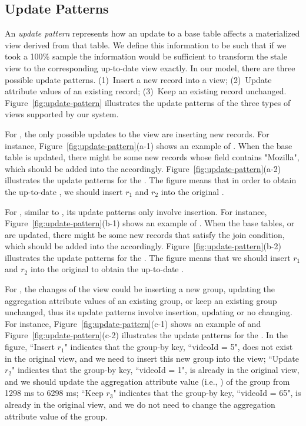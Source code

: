 \subsection{Update Patterns}\label{subsec:pattern}
An \emph{update pattern} represents how an update to a base table affects a materialized view derived from that table.
We define this information to be such that if we took a 100\% sample the information would be sufficient to transform the stale view to the corresponding up-to-date view exactly. 
In our model, there are three possible update patterns. (1)~Insert a new record into a view;
(2)~Update attribute values of an existing record; (3)~Keep an existing record unchanged.
Figure~\ref{fig:update-pattern} illustrates the update patterns of the three types of views supported by our system.

For \spview, the only possible updates to the view are inserting new records.  
For instance, Figure~\ref{fig:update-pattern}(a-1) shows an example of \spview. When the base table  is updated, there might be some new records whose  field contains "Mozilla", which should be added into the \spview accordingly. Figure~\ref{fig:update-pattern}(a-2) illustrates the update patterns for the \spview. The figure means that in order to obtain the up-to-date \spview, we should insert $r_1$ and $r_2$ into the original \spview.

For \fjview, similar to \spview, its update patterns only involve insertion. For instance, Figure~\ref{fig:update-pattern}(b-1) shows an example of \fjview. When the base tables,  or  are updated, there might be some new records that satisfy the join condition, which should be added into the \fjview accordingly. Figure~\ref{fig:update-pattern}(b-2) illustrates the update patterns for the \fjview. The figure means that we should insert $r_1$ and $r_2$ into the original \fjview to obtain the up-to-date \fjview.

For \aggview, the changes of the view could be inserting a new group, updating the aggregation attribute values of an existing group, or keep an existing group unchanged, thus its update patterns involve insertion, updating or no changing. 
For instance, Figure~\ref{fig:update-pattern}(c-1) shows an example of \aggview and Figure~\ref{fig:update-pattern}(c-2) illustrates the update patterns for the \aggview. In the figure, ``Insert $r_1$" indicates that the group-by key, ``videoId = 5", does not exist in the original view, and we need to insert this new group into the view; ``Update $r_2$" indicates that the group-by key, ``videoId = 1", is already in the original view, and we should update the aggregation attribute value (i.e., ) of the group from 1298 ms to 6298 ms; ``Keep $r_3$" indicates that the group-by key, ``videoId = 65", is already in the original  view, and we do not need to change the aggregation attribute value of the group.    



